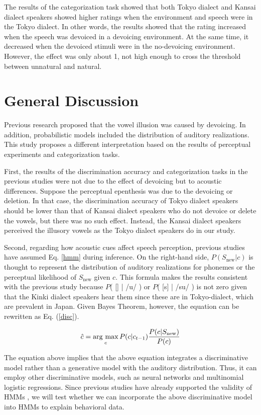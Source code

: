 \documentclass[a4paper,11pt,twocolumn]{article}
\newcommand{\argmax}{\mathop{\rm arg~max}\limits}
\begin{document}
The results of the categorization task showed that both Tokyo dialect and Kansai dialect speakers showed higher ratings when the environment and speech were in the Tokyo dialect. In other words, the results showed that the rating increased when the speech was devoiced in a devoicing environment. At the same time, it decreased when the devoiced stimuli were in the no-devoicing environment. However, the effect was only about 1, not high enough to cross the threshold between unnatural and natural.

\section{General Discussion}

Previous research proposed that the vowel illusion was caused by devoicing. In addition, probabilistic models included the distribution of auditory realizations. This study proposes a different interpretation based on the results of perceptual experiments and categorization tasks.

First, the results of the discrimination accuracy and categorization tasks in the previous studies were not due to the effect of devoicing but to acoustic differences. Suppose the perceptual epenthesis was due to the devoicing or deletion. In that case, the discrimination accuracy of Tokyo dialect speakers should be lower than that of Kansai dialect speakers who do not devoice or delete the vowels, but there was no such effect. Instead, the Kansai dialect speakers perceived the illusory vowels as the Tokyo dialect speakers do in our study.

Second, regarding how acoustic cues affect speech perception, previous studies \cite{wilson2013bayesian, kishiyama2021influence} have assumed Eq. \ref{hmm} during inference. On the right-hand side, $P(S_{\text{new}}|c)$ is thought to represent the distribution of auditory realizations for phonemes or the perceptual likelihood of $S_{\text{new}}$ given $c$. This formula makes the results consistent with the previous study because $P$( [\textsubring{\textturnm}] | /u/ ) or $P$( [s] | /su/ ) is not zero given that the Kinki dialect speakers hear them since these are in Tokyo-dialect, which are prevalent in Japan. Given Bayes Theorem, however, the equation can be rewritten as Eq. (\ref{disc}).

\begin{equation} \label{disc}
    \hat{c} = \argmax_{c} P(c | c_{t-1}) \frac{P(c|S_{\text{new}})}{P(c)}
\end{equation}

The equation above implies that the above equation integrates a discriminative model rather than a generative model with the auditory distribution. Thus, it can employ other discriminative models, such as neural networks and multinomial logistic regressions. Since previous studies have already supported the validity of HMMs \cite{kishiyama2021influence}, we will test whether we can incorporate the above discriminative model into HMMs to explain behavioral data.




\end{document}
